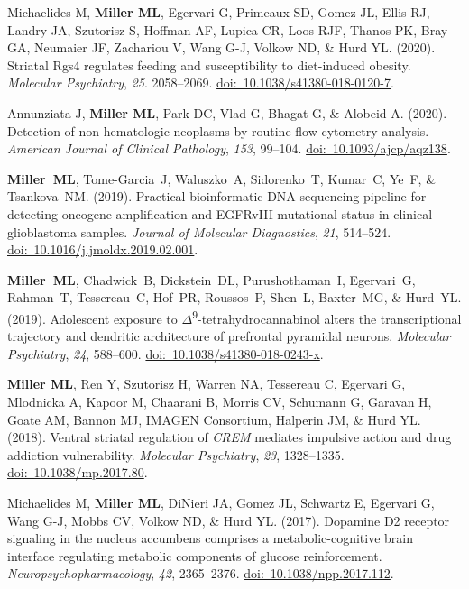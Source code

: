 \documentclass[10pt]{article}
\begin{document}
\begin{description}
\item Michaelides M, \textbf{Miller ML}, Egervari G, Primeaux SD, Gomez JL, Ellis RJ, Landry JA, Szutorisz S, Hoffman AF, Lupica CR, Loos RJF, Thanos PK, Bray GA, Neumaier JF, Zachariou V, Wang G-J, Volkow ND, \& Hurd YL. (2020). Striatal Rgs4 regulates feeding and susceptibility to diet-induced obesity. \textit{Molecular Psychiatry}, \textit{25}. 2058--2069. \href{https://doi.org/10.1038/s41380-018-0120-7}{doi:~10.1038/s41380-018-0120-7}.
\item Annunziata J, \textbf{Miller ML}, Park DC, Vlad G, Bhagat G, \& Alobeid A. (2020). Detection of non-hematologic neoplasms by routine flow cytometry analysis. \textit{American Journal of Clinical Pathology}, \textit{153}, 99--104. \href{https://doi.org/10.1093/ajcp/aqz138}{doi:~10.1093/ajcp/aqz138}.
\item \textbf{Miller~ML}, Tome-Garcia~J, Waluszko~A, Sidorenko~T, Kumar~C, Ye~F, \& Tsankova~NM. (2019). Practical bioinformatic DNA-sequencing pipeline for detecting oncogene amplification and EGFRvIII mutational status in clinical glioblastoma samples. \textit{Journal of Molecular Diagnostics}, \textit{21}, 514--524. \href{https://doi.org/10.1016/j.jmoldx.2019.02.001}{doi:~10.1016/j.jmoldx.2019.02.001}.
\item \textbf{Miller~ML}, Chadwick~B, Dickstein~DL, Purushothaman~I, Egervari~G, Rahman~T, Tessereau~C, Hof~PR, Roussos~P, Shen~L, Baxter~MG, \& Hurd~YL. (2019). Adolescent exposure to $\Delta$\textsuperscript{9}-tetrahydrocannabinol alters the transcriptional trajectory and dendritic architecture of prefrontal pyramidal neurons. \textit{Molecular Psychiatry}, \textit{24}, 588--600. \href{https://doi.org/10.1038/s41380-018-0243-x}{doi:~10.1038/s41380-018-0243-x}.
\item \textbf{Miller ML}, Ren Y, Szutorisz H, Warren NA, Tessereau C, Egervari G, Mlodnicka A, Kapoor M, Chaarani B, Morris CV, Schumann G, Garavan H, Goate AM, Bannon MJ, IMAGEN Consortium, Halperin JM, \& Hurd YL. (2018). Ventral striatal regulation of \textit{CREM} mediates impulsive action and drug addiction vulnerability. \textit{Molecular Psychiatry}, \textit{23}, 1328--1335. \href{https://doi.org/10.1038/mp.2017.80}{doi:~10.1038/mp.2017.80}.
\item Michaelides M, \textbf{Miller ML}, DiNieri JA, Gomez JL, Schwartz E, Egervari G, Wang G-J, Mobbs CV, Volkow ND, \& Hurd YL. (2017). Dopamine D2 receptor signaling in the nucleus accumbens comprises a metabolic-cognitive brain interface regulating metabolic components of glucose reinforcement. \textit{Neuropsychopharmacology}, \textit{42}, 2365--2376. \href{https://doi.org/10.1038/npp.2017.112}{doi:~10.1038/npp.2017.112}.

\end{description}
\end{document}
